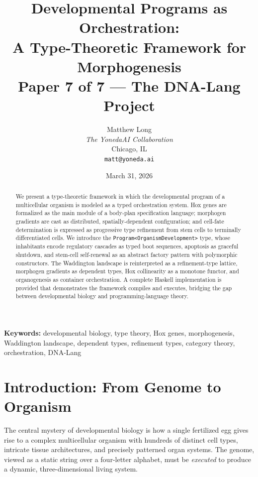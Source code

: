 \documentclass[12pt,a4paper]{article}
\title{%
  \textbf{Developmental Programs as Orchestration:}\\[6pt]
  \Large A Type-Theoretic Framework for Morphogenesis\\[12pt]
  \large Paper 7 of 7 --- The DNA-Lang Project
}
\author{
  Matthew Long\\
  \textit{The YonedaAI Collaboration}\\
  Chicago, IL\\
  \texttt{matt@yoneda.ai}
}
\date{March 31, 2026}
\begin{document}
\maketitle

\begin{abstract}
\noindent
We present a type-theoretic framework in which the developmental program
of a multicellular organism is modeled as a typed orchestration system.
Hox genes are formalized as the main module of a body-plan specification
language; morphogen gradients are cast as distributed, spatially-dependent
configuration; and cell-fate determination is expressed as progressive
type refinement from stem cells to terminally differentiated cells.
We introduce the \texttt{Program\textless{}OrganismDevelopment\textgreater{}}
type, whose inhabitants encode regulatory cascades as typed boot sequences,
apoptosis as graceful shutdown, and stem-cell self-renewal as an abstract
factory pattern with polymorphic constructors.  The Waddington landscape
is reinterpreted as a refinement-type lattice, morphogen gradients as
dependent types, Hox collinearity as a monotone functor, and organogenesis
as container orchestration.  A complete Haskell implementation is provided
that demonstrates the framework compiles and executes, bridging the gap
between developmental biology and programming-language theory.
\end{abstract}

\vspace{1em}
\noindent\textbf{Keywords:} developmental biology, type theory, Hox genes,
morphogenesis, Waddington landscape, dependent types, refinement types,
category theory, orchestration, DNA-Lang

\tableofcontents
\newpage

\section{Introduction: From Genome to Organism}\label{sec:intro}

The central mystery of developmental biology is how a single fertilized egg
gives rise to a complex multicellular organism with hundreds of distinct cell
types, intricate tissue architectures, and precisely patterned organ systems.
The genome, viewed as a static string over a four-letter alphabet, must be
\emph{executed} to produce a dynamic, three-dimensional living system.
\end{document}
